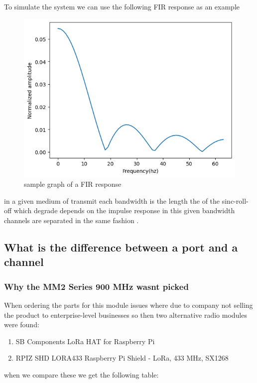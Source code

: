 To simulate the system we can use the following FIR response  as an example 
\begin{figure}[h!]
    \includegraphics[width=0.5\linewidth]{Images/FIR_response.png}
    \caption{sample graph of a FIR response}
    \label{sample graph of a FIR response}

\end{figure}
in a given  medium  of  transmit each bandwidth is the length the of the  sinc-roll-off which degrade depends on the  impulse response in this given bandwidth channels are separated in the same fashion .
\subsection{What is  the difference  between a  port and a channel}
\newpage
\subsubsection{Why the MM2 Series 900 MHz wasnt picked}
When ordering the parts for  this module issues where due to company not selling the product to  enterprise-level businesses so then two alternative radio modules were found:
\begin{enumerate}
    \item SB Components LoRa HAT for Raspberry Pi
    \item RPIZ SHD LORA433 Raspberry Pi Shield - LoRa, 433 MHz, SX1268
\end{enumerate}
when we compare these we get the following table:

